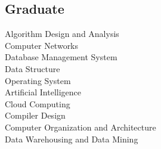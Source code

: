 \documentclass[]{resume-openfont}
\begin{document}
\begin{minipage}[t]{0.33\textwidth}
\subsection{Graduate}
Algorithm Design and Analysis \\
Computer Networks \\
Database Management System \\
Data Structure \\
Operating System \\
Artificial Intelligence \\
Cloud Computing \\
Compiler Design \\
Computer Organization and Architecture \\
Data Warehousing and Data Mining 
\sectionsep

%
%

\end{minipage} 
\hfill
\end{document}
